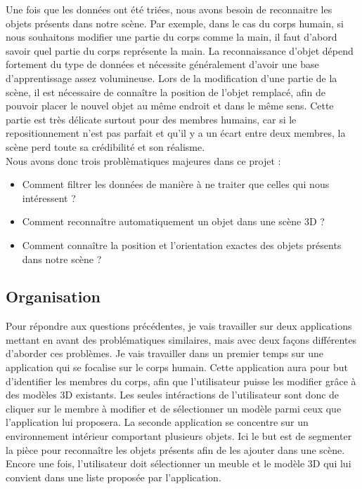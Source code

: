 Une fois que les données ont été triées, nous avons besoin de reconnaitre les objets présents dans notre scène. Par exemple, dans
le cas du corps humain, si nous souhaitons modifier une partie du corps comme la main, il faut d'abord savoir quel partie du corps représente 
la main. La reconnaissance d'objet dépend fortement du type de données et nécessite généralement d'avoir une base d'apprentissage 
assez volumineuse. Lors de la modification d'une partie de la scène, il est nécessaire de connaître la position de l'objet remplacé, afin de pouvoir
placer le nouvel objet au même endroit et dans le même sens. Cette partie est très délicate surtout pour des membres humains, car
si le repositionnement n'est pas parfait et qu'il y a un écart entre deux membres, la scène perd toute sa crédibilité et son 
réalisme.\\

Nous avons donc trois problèmatiques majeures dans ce projet : 
\begin{itemize}
  \item Comment filtrer les données de manière à ne traiter que celles qui nous intéressent ?
  \item Comment reconnaître automatiquement un objet dans une scène 3D ?
  \item Comment connaître la position et l'orientation exactes des objets présents dans notre scène ?
\end{itemize}

\subsection{Organisation}

Pour répondre aux questions précédentes, je vais travailler sur deux applications mettant en avant des problématiques similaires,
mais avec deux façons différentes d'aborder ces problèmes. Je vais travailler dans un premier temps sur une application qui se focalise
sur le corps humain. Cette application aura pour but d'identifier les membres du corps, afin que l'utilisateur puisse les modifier
grâce à des modèles 3D existants. Les seules intéractions de l'utilisateur sont donc de cliquer sur le membre à modifier et de sélectionner
un modèle parmi ceux que l'application lui proposera. La seconde application se concentre sur un environnement intérieur comportant plusieurs
objets. Ici le but est de segmenter la pièce pour reconnaître les objets présents afin de les ajouter dans une scène. Encore une fois,
l'utilisateur doit sélectionner un meuble et le modèle 3D qui lui convient dans une liste proposée par l'application.\\

